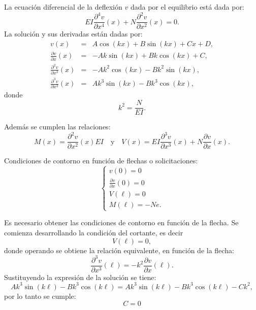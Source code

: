 La ecuación diferencial de la deflexión $v$ dada por el equilibrio está dada por:
%
\begin{equation}
  E I \frac{\partial^4 v}{\partial x^4}(x)
+   N \frac{\partial^2 v}{\partial x^2}(x)
=   0.
\end{equation}
%
La solución y sus derivadas están dadas por:
%
\begin{eqnarray}
                               v  (x) &=& A \cos(k x ) + B \sin(kx) + C x + D, \\
\frac{\partial   v}{\partial x  } (x) &=& -A k \sin(k x ) + B k \cos(kx) + C , \\
\frac{\partial^2 v}{\partial x^2} (x) &=& - A k^2 \cos(k x ) - B k^2 \sin(kx),  \\
\frac{\partial^3 v}{\partial x^3} (x) &=& A k^3 \sin(k x ) - B k^3 \cos(kx), 
\end{eqnarray}
donde
$$
  k^2 = \frac{N}{EI}.
$$

Además se cumplen las relaciones:
$$
M(x)=\frac{\partial^2 v}{\partial x^2}(x) EI \quad \text{y} \quad V(x) = EI \frac{\partial^3 v}{\partial x^3}(x) + N \frac{\partial v}{\partial x}(x).
$$

Condiciones de contorno en función de flechas o solicitaciones:
%
\begin{equation}
\left\{
\begin{array}{l}
v(0)=0 \\[.5em]
\displaystyle \frac{\partial v}{\partial x}(0)=0\\[1em]
V(\ell)=0\\[.5em]
M(\ell)=-N e.
\end{array}
\right.
\end{equation}

Es necesario obtener las condiciones de contorno en función de la flecha. %
Se comienza desarrollando la condición del cortante, es decir
%
\begin{equation}
	V(\ell) = 0,
\end{equation}
donde operando se obtiene la relación equivalente, en función de la flecha:
%
\begin{equation}
  \frac{\partial^3 v}{\partial x^3} (\ell) = - k^2 \frac{\partial v}{\partial x}(\ell).
\end{equation}
%
Sustituyendo la expresión de la solución se tiene:
%	
\begin{equation}
	Ak^3 \sin(k\ell) - Bk^3 \cos(k\ell) = Ak^3 \sin(k\ell) - Bk^3 \cos(k\ell) - C k^2,
\end{equation}
por lo tanto se cumple:
\begin{equation}\label{eqn:ejemplopand}
\boxed{
  C=0
}
\end{equation}

